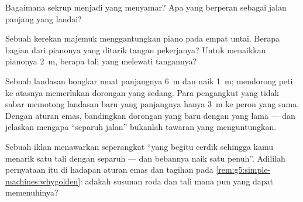 \begin{exercise}[$\star$]\label{exo:g5:simple-machines:8}
Bagaimana sekrup menjadi  yang menyamar? Apa yang
berperan sebagai jalan panjang yang landai?
\end{exercise}

\begin{exercise}[$\star\star$]\label{exo:g5:simple-machines:9}
Sebuah kerekan majemuk menggantungkan piano pada empat untai. Berapa
bagian dari  pianonya yang ditarik tangan pekerjanya? Untuk
menaikkan pianonya \qty{2}{m}, berapa  tali yang melewati
tangannya?
\end{exercise}

\begin{exercise}[$\star\star$]\label{exo:g5:simple-machines:10}
Sebuah landasan bongkar muat panjangnya \qty{6}{m} dan naik
\qty{1}{m}; mendorong peti ke atasnya memerlukan dorongan yang sedang.
Para pengangkut yang tidak sabar memotong landasan baru yang
panjangnya hanya \qty{3}{m} ke peron yang sama. Dengan aturan emas,
bandingkan dorongan yang baru dengan yang lama --- dan jelaskan
mengapa ``separuh jalan'' bukanlah tawaran yang menguntungkan.
\end{exercise}

\begin{exercise}[$\star\star$]\label{exo:g5:simple-machines:11}
Sebuah iklan menawarkan seperangkat  ``yang begitu cerdik
sehingga kamu menarik satu  tali dengan separuh  --- dan
bebannya naik satu  penuh''. Adililah pernyataan itu di hadapan
aturan emas dan tagihan  pada
\cref{rem:g5:simple-machines:whygolden}: adakah susunan roda dan tali
mana pun yang dapat memenuhinya?
\end{exercise}
